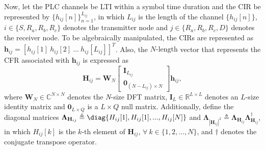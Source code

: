 Now, let the \ac{PLC} channels be \ac{LTI} within a symbol time duration and the \ac{CIR} be represented by $\{h_{ij}[n]\}_{n=1}^{L_{ij}}$, in which $ L_{ij} $ is the length of the channel $ \{h_{ij}[n]\} $, $ i \in \{S,R_{a},R_{b},R_{c}\}$ denotes the transmitter node and $ j \in \{R_{a},R_{b},R_{c},D\}$ denotes the receiver node. To be algebraically manipulated, the \ac{CIR}s are represented as $ \mathbf{h}_{ij} = [h_{ij}[1]\  h_{ij}[2]\ ...\ h_{ij}[L_{ij}]]^T $. Also, the $ N\text{-length} $ vector that represents the \ac{CFR} associated with $ \mathbf{h}_{ij} $ is expressed as
\begin{equation}
	\mathbf{H}_{ij} = \mathbf{W}_{N}  \begin{bmatrix} \mathbf{I}_{L_{ij}} \\ \mathbf{0}_{(N-L_{ij})\times N} \end{bmatrix} \mathbf{h}_{ij},
\end{equation}
where $\mathbf{W}_{N} \in \mathbb{C}^{N\times N}$ denotes the \textit{N}-size \ac{DFT} matrix, $ \mathbf{I}_{L} \in \mathbb{R}^{L\times L}$ denotes an $L$-size identity matrix and $ \mathbf{0}_{L\times Q} $ is a $ L \times Q $ null matrix. Additionally, define the diagonal matrices $ \mathbf{\Lambda}_{\mathbf{H}_{ij}} \triangleq \diag \{H_{ij}[1], H_{ij}[1],...,H_{ij}[N]\} $ and $ \mathbf{\Lambda}_{|\mathbf{H}_{ij}|^2} \triangleq \mathbf{\Lambda}_{\mathbf{H}_{ij}} \mathbf{\Lambda}_{\mathbf{H}_{ij}}^\dagger $, in which $ H_{ij}[k] $ is the $k$-th element of $ \mathbf{H}_{ij} $, $ \forall \ k \in \{1,2,...,N\} $, and $\dagger$ denotes the conjugate transpose operator.

